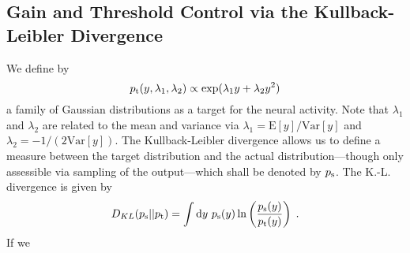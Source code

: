 \documentclass[10pt,a4paper]{article}
\begin{document}
\subsection{Gain and Threshold Control via the Kullback-Leibler Divergence}
We define by
\begin{equation}
p_{\rm t}(y,\lambda_1,\lambda_2) \propto \exp(\lambda_1 y + \lambda_2 y^2)
\end{equation}
a family of Gaussian distributions as a target for the neural activity. Note that $\lambda_1$ and $\lambda_2$ are related to the mean and variance via $\lambda_1 = \mathrm{E}[y]/\mathrm{Var}[y]$ and $\lambda_2 = -1/(2 \mathrm{Var}[y])$. The Kullback-Leibler divergence allows us to define a measure between the target distribution and the actual distribution---though only assessible via sampling of the output---which shall be denoted by $p_{\rm s}$. The K.-L. divergence is given by
\begin{equation}
D_{KL}(p_{\rm s}||p_{\rm t}) = \int \mathrm{d}y \ p_{\rm s}(y) \ln \left( \frac{p_{\rm s}(y)}{p_{\rm t}(y)} \right) \; .
\end{equation}
If we 
\end{document}
